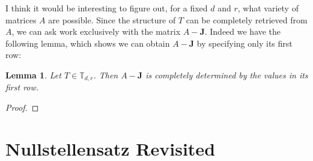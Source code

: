 \documentclass[12]{article}
\newtheorem{lem}{Lemma} %
\theoremstyle{definition}
\begin{document}
	I think it would be interesting to figure out, for a fixed $d$ and $r$, what variety of matrices $A$ are possible.  Since the structure of $T$ can be completely retrieved from $A$, we can ask work exclusively with the matrix $A - \mathbf{J}$.  Indeed we have the following lemma, which shows we can obtain $A - \mathbf{J}$ by specifying only its first row:
	
	\begin{lem}
		Let $T \in \mathbb{T}_{d,r}$.  Then $A - \mathbf{J}$ is completely determined by the values in its first row.
	\end{lem}
	
	\begin{proof}
		
	\end{proof}
	
	\section{Nullstellensatz Revisited}
	
\end{document}
